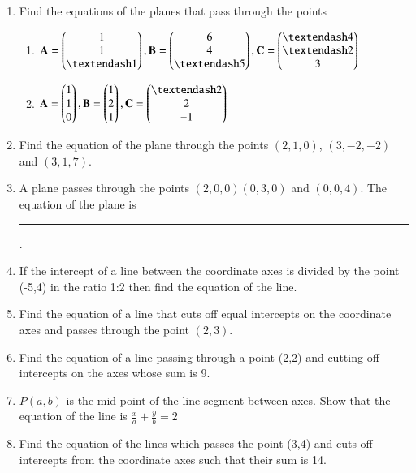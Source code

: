 \begin{enumerate}[label=\thesubsection.\arabic*,ref=\thesubsection.\theenumi]
\label{chapters/11/10/2/9}
\\
\solution

	\item Find the equations of the planes that pass through the points
\begin{enumerate}
\item $\vec{A}= \myvec{1\\1\\– 1}, \vec{B}=\myvec{6\\4\\– 5},\vec{C}= \myvec{– 4\\– 2\\3}$
\item $\vec{A}= \myvec{1\\1\\0}, \vec{B}= \myvec{1\\2\\1}, \vec{C}= \myvec{– 2\\2\\-1}$
\end{enumerate}
    \solution
		
\item Find the equation of the plane through the points $(2,1,0)$, $(3,-2,-2)$ and $(3,1,7)$.
\item A plane passes through the points $(2,0,0) (0,3,0)$ and $(0,0,4)$. The equation of the plane is \noindent\rule{2cm}{0.4pt}.
\item If the intercept of a line between the coordinate axes is divided by the point (-5,4) in the ratio 1:2 then find the equation of the line.
\item Find the equation of a line that cuts off equal intercepts on the coordinate axes and passes through the point $(2,3)$.  
	\\
\solution 
\label{chapters/11/10/2/12}

\item 
Find the equation of a line passing through a point (2,2) and cutting off intercepts on the axes whose sum is 9.
\label{chapters/11/10/2/13}
	\\
	\solution 

\item 
$P(a,b)$ is the mid-point of the line segment between axes. Show that the equation of the line is $\frac{x}{a}+\frac{y}{b}=2$
\label{chapters/11/10/2/18}
\\
\solution

\item Find the equation of the lines which passes the point (3,4) and cuts off intercepts from the coordinate axes such that their sum is 14.

\end{enumerate}
